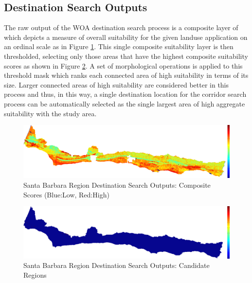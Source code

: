     \subsection{Destination Search Outputs}
    
The raw output of the WOA destination search process is a composite layer of which depicts a measure of overall suitability for the given landuse application on an ordinal scale as in Figure \ref{fig:SBdsoutputs_comp}. This single composite suitability layer is then thresholded, selecting only those areas that have the highest composite suitability scores as shown in Figure \ref{fig:SBdsoutputs_cand}. A set of morphological operations is applied to this threshold mask which ranks each connected area of high suitability in terms of its size. Larger connected areas of high suitability are considered better in this process and thus, in this way, a single destination location for the corridor search process can be automatically selected as the single largest area of high aggregate suitability with the study area. 
    
        \begin{figure}[!h]
            \begin{center}
            \includegraphics[width=5.5in]{figures/SantaBarbara_Search_Composite.png}   
            \caption{Santa Barbara Region Destination Search Outputs: Composite Scores (Blue:Low, Red:High)}
            \label{fig:SBdsoutputs_comp}
            \end{center}
        \end{figure}
        
        \begin{figure}[!h]
            \begin{center}
            \includegraphics[width=5.5in]{figures/SantaBarbara_Search_Output.png}   
            \caption{Santa Barbara Region Destination Search Outputs: Candidate Regions}
            \label{fig:SBdsoutputs_cand}
            \end{center}
        \end{figure}

